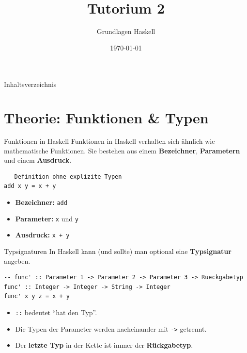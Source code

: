 \documentclass[aspectratio=169,11pt]{beamer}
\title{\textbf{Tutorium 2}}
\subtitle{Grundlagen Haskell}
\institute{Grundlagen der Praktischen Informatik}
\author{}
\date{\today}
\begin{document}
\begin{frame}[plain]
    \titlepage
\end{frame}

\begin{frame}{Inhaltsverzeichnis}
    \tableofcontents
\end{frame}

\section{Theorie: Funktionen \& Typen}

\begin{frame}[fragile]{Funktionen in Haskell}
    Funktionen in Haskell verhalten sich ähnlich wie mathematische Funktionen. Sie bestehen aus einem \textbf{Bezeichner}, \textbf{Parametern} und einem \textbf{Ausdruck}.
    
    \begin{tcolorbox}[modernbox, title=Beispiel: Addition]
\begin{lstlisting}
-- Definition ohne explizite Typen
add x y = x + y
\end{lstlisting}
    \end{tcolorbox}
    
    \begin{itemize}
        \item \textbf{Bezeichner:} \texttt{add}
        \item \textbf{Parameter:} \texttt{x} und \texttt{y}
        \item \textbf{Ausdruck:} \texttt{x + y}
    \end{itemize}
\end{frame}

\begin{frame}[fragile]{Typsignaturen}
    In Haskell kann (und sollte) man optional eine \textbf{Typsignatur} angeben.
    
    \begin{tcolorbox}[modernbox, title=Funktion mit Typsignatur]
\begin{lstlisting}
-- func' :: Parameter 1 -> Parameter 2 -> Parameter 3 -> Rueckgabetyp
func' :: Integer -> Integer -> String -> Integer
func' x y z = x + y
\end{lstlisting}
    \end{tcolorbox}
    
    \begin{itemize}
        \item \texttt{::} bedeutet ``hat den Typ''.
        \item Die Typen der Parameter werden nacheinander mit \texttt{->} getrennt.
        \item Der \textbf{letzte Typ} in der Kette ist immer der \textbf{Rückgabetyp}.
    \end{itemize}
\end{frame}
\end{document}
